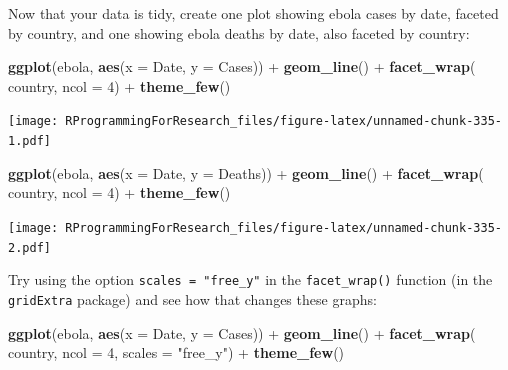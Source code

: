 \documentclass[]{book}
\makeatletter
\newenvironment{Shaded}{\begin{snugshade}}{\end{snugshade}}
\newcommand{\KeywordTok}[1]{\textcolor[rgb]{0.13,0.29,0.53}{\textbf{{#1}}}}
\newcommand{\DataTypeTok}[1]{\textcolor[rgb]{0.13,0.29,0.53}{{#1}}}
\newcommand{\DecValTok}[1]{\textcolor[rgb]{0.00,0.00,0.81}{{#1}}}
\newcommand{\StringTok}[1]{\textcolor[rgb]{0.31,0.60,0.02}{{#1}}}
\newcommand{\NormalTok}[1]{{#1}}
\newenvironment{kframe}{%
\medskip{}
\setlength{\fboxsep}{.8em}
 \def\at@end@of@kframe{}%
 \ifinner\ifhmode%
  \def\at@end@of@kframe{\end{minipage}}%
  \begin{minipage}{\columnwidth}%
 \fi\fi%
 \def\FrameCommand##1{\hskip\@totalleftmargin \hskip-\fboxsep
 \colorbox{shadecolor}{##1}\hskip-\fboxsep
     \hskip-\linewidth \hskip-\@totalleftmargin \hskip\columnwidth}%
 \MakeFramed {\advance\hsize-\width
   \@totalleftmargin\z@ \linewidth\hsize
   \@setminipage}}%
 {\par\unskip\endMakeFramed%
 \at@end@of@kframe}
\renewenvironment{Shaded}{\begin{kframe}}{\end{kframe}}
\makeatother
\begin{document}
Now that your data is tidy, create one plot showing ebola cases by date,
faceted by country, and one showing ebola deaths by date, also faceted
by country:

\begin{Shaded}
\begin{Highlighting}[]
\KeywordTok{ggplot}\NormalTok{(ebola, }\KeywordTok{aes}\NormalTok{(}\DataTypeTok{x =} \NormalTok{Date, }\DataTypeTok{y =} \NormalTok{Cases)) +}\StringTok{ }
\StringTok{        }\KeywordTok{geom_line}\NormalTok{() +}\StringTok{ }
\StringTok{        }\KeywordTok{facet_wrap}\NormalTok{(~}\StringTok{ }\NormalTok{country, }\DataTypeTok{ncol =} \DecValTok{4}\NormalTok{) +}\StringTok{ }
\StringTok{        }\KeywordTok{theme_few}\NormalTok{()}
\end{Highlighting}
\end{Shaded}

\texttt{[image: RProgrammingForResearch\_files/figure-latex/unnamed-chunk-335-1.pdf]}

\begin{Shaded}
\begin{Highlighting}[]
\KeywordTok{ggplot}\NormalTok{(ebola, }\KeywordTok{aes}\NormalTok{(}\DataTypeTok{x =} \NormalTok{Date, }\DataTypeTok{y =} \NormalTok{Deaths)) +}\StringTok{ }
\StringTok{        }\KeywordTok{geom_line}\NormalTok{() +}\StringTok{ }
\StringTok{        }\KeywordTok{facet_wrap}\NormalTok{(~}\StringTok{ }\NormalTok{country, }\DataTypeTok{ncol =} \DecValTok{4}\NormalTok{) +}\StringTok{ }
\StringTok{        }\KeywordTok{theme_few}\NormalTok{()}
\end{Highlighting}
\end{Shaded}

\texttt{[image: RProgrammingForResearch\_files/figure-latex/unnamed-chunk-335-2.pdf]}

Try using the option \texttt{scales\ =\ "free\_y"} in the
\texttt{facet\_wrap()} function (in the \texttt{gridExtra} package) and
see how that changes these graphs:

\begin{Shaded}
\begin{Highlighting}[]
\KeywordTok{ggplot}\NormalTok{(ebola, }\KeywordTok{aes}\NormalTok{(}\DataTypeTok{x =} \NormalTok{Date, }\DataTypeTok{y =} \NormalTok{Cases)) +}\StringTok{ }
\StringTok{        }\KeywordTok{geom_line}\NormalTok{() +}\StringTok{ }
\StringTok{        }\KeywordTok{facet_wrap}\NormalTok{(~}\StringTok{ }\NormalTok{country, }\DataTypeTok{ncol =} \DecValTok{4}\NormalTok{, }\DataTypeTok{scales =} \StringTok{"free_y"}\NormalTok{) +}\StringTok{ }
\StringTok{        }\KeywordTok{theme_few}\NormalTok{()}
\end{Highlighting}
\end{Shaded}
\end{document}
